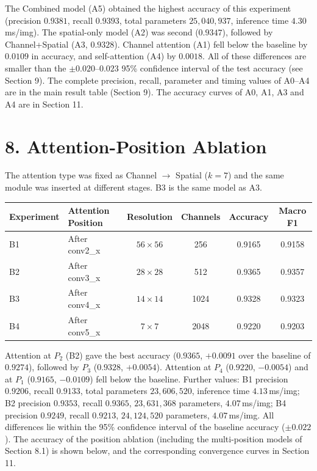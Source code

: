 \documentclass[10pt]{article}
\begin{document}
The Combined model (A5) obtained the highest accuracy of this experiment
(precision $0.9381$, recall $0.9393$, total parameters $25{,}040{,}937$,
inference time $4.30$\,ms/img). The spatial-only model (A2) was second
($0.9347$), followed by Channel+Spatial (A3, $0.9328$). Channel attention (A1)
fell below the baseline by $0.0109$ in accuracy, and self-attention (A4) by
$0.0018$. All of these differences are smaller than the $\pm0.020$--$0.023$
95\% confidence interval of the test accuracy (see Section 9). The complete
precision, recall, parameter and timing values of A0--A4 are in the main
result table (Section 9). The accuracy curves of A0, A1, A3 and A4 are in
Section 11.

\section*{8. Attention-Position Ablation}

The attention type was fixed as Channel $\rightarrow$ Spatial ($k=7$) and the
same module was inserted at different stages. B3 is the same model as A3.

\begin{center}

\begin{tabular}{|l|l|c|c|c|c|}
\hline

\textbf{Experiment}
&
\textbf{Attention Position}
&
\textbf{Resolution}
&
\textbf{Channels}
&
\textbf{Accuracy}
&
\textbf{Macro F1}
\\
\hline

B1
&
After conv2\_x
&
$56\times56$
&
256
&
0.9165
&
0.9158
\\
\hline

B2
&
After conv3\_x
&
$28\times28$
&
512
&
0.9365
&
0.9357
\\
\hline

B3
&
After conv4\_x
&
$14\times14$
&
1024
&
0.9328
&
0.9323
\\
\hline

B4
&
After conv5\_x
&
$7\times7$
&
2048
&
0.9220
&
0.9203
\\
\hline

\end{tabular}

\end{center}

Attention at $P_2$ (B2) gave the best accuracy ($0.9365$, $+0.0091$ over the
baseline of $0.9274$), followed by $P_3$ ($0.9328$, $+0.0054$). Attention at
$P_4$ ($0.9220$, $-0.0054$) and at $P_1$ ($0.9165$, $-0.0109$) fell below the
baseline. Further values: B1 precision $0.9206$, recall $0.9133$, total
parameters $23{,}606{,}520$, inference time $4.13$\,ms/img; B2 precision
$0.9353$, recall $0.9365$, $23{,}631{,}368$ parameters, $4.07$\,ms/img; B4
precision $0.9249$, recall $0.9213$, $24{,}124{,}520$ parameters,
$4.07$\,ms/img. All differences lie within the 95\% confidence interval of the
baseline accuracy ($\pm0.022$). The accuracy of the position ablation
(including the multi-position models of Section 8.1) is shown below, and the
corresponding convergence curves in Section 11.
\end{document}
